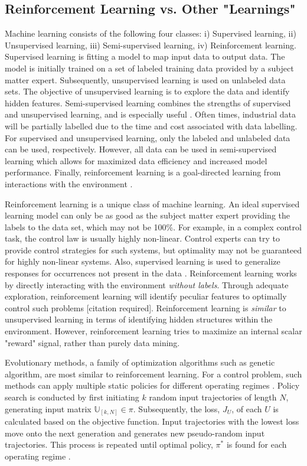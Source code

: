 \subsection{Reinforcement Learning vs. Other "Learnings"}

Machine learning consists of the following four classes: i) Supervised learning, ii) Unsupervised learning, iii) Semi-supervised learning, iv) Reinforcement learning.  Supervised learning is fitting a model to map input data to output data.  The model is initially trained on a set of labeled training data provided by a subject matter expert.  Subsequently, unsupervised learning is used on unlabeled data sets.  The objective of unsupervised learning is to explore the data and identify hidden features. Semi-supervised learning combines the strengths of supervised and unsupervised learning, and is especially useful \cite{machine_learning}.  Often times, industrial data will be partially labelled due to the time and cost associated with data labelling.  For supervised and unsupervised learning, only the labeled and unlabeled data can be used, respectively.  However, all data can be used in semi-supervised learning which allows for maximized data efficiency and increased model performance. Finally, reinforcement learning is a goal-directed learning from interactions with the environment \cite{sutton}.

Reinforcement learning is a unique class of machine learning.  An ideal supervised learning model can only be as good as the subject matter expert providing the labels to the data set, which may not be 100\%.  For example, in a complex control task, the control law is usually highly non-linear. Control experts can try to provide control strategies for such systems, but optimality may not be guaranteed for highly non-linear systems. Also, supervised learning is used to generalize responses for occurrences not present in the data \cite{sutton}.  Reinforcement learning works by directly interacting with the environment \textit{without labels}. Through adequate exploration, reinforcement learning will identify peculiar features to optimally control such problems [citation required].  Reinforcement learning is \textit{similar} to unsupervised learning in terms of identifying hidden structures within the environment.  However, reinforcement learning tries to maximize an internal scalar "reward" signal, rather than purely data mining.

Evolutionary methods, a family of optimization algorithms such as genetic algorithm, are most similar to reinforcement learning.  For a control problem, such methods can apply multiple static policies for different operating regimes \cite{sutton}.  Policy search is conducted by first initiating $k$ random input trajectories of length $N$, generating input matrix $\mathbb{U}_{[k, N]} \in \pi$.  Subsequently, the loss, $J_U$, of each $U$ is calculated based on the objective function.  Input trajectories with the lowest loss move onto the next generation and generates new pseudo-random input trajectories.  This process is repeated until optimal policy, $\pi^*$ is found for each operating regime \cite{ga_for_control}.

